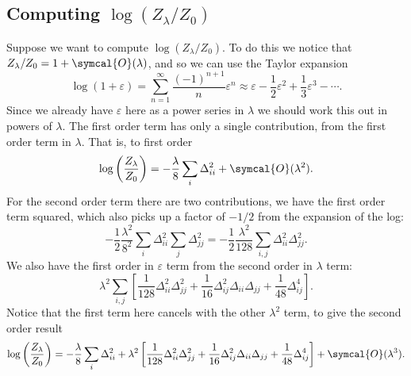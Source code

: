 \documentclass[fleqn]{NotesClass}
\newcommand{\order}{\symcal{O}}
\begin{document}
    \subsection{Computing \texorpdfstring{\(\log(Z_\lambda/Z_0)\)}{log(Zlambda/Z0)}}
    Suppose we want to compute \(\log(Z_\lambda/Z_0)\).
    To do this we notice that \(Z_\lambda/Z_0 = 1 + \order(\lambda)\), and so we can use the Taylor expansion
    \begin{equation}
        \log(1 + \varepsilon) = \sum_{n = 1}^{\infty} \frac{(-1)^{n + 1}}{n}\varepsilon^n \approx \varepsilon - \frac{1}{2}\varepsilon^2 + \frac{1}{3}\varepsilon^3 - \dotsb.
    \end{equation}
    Since we already have \(\varepsilon\) here as a power series in \(\lambda\) we should work this out in powers of \(\lambda\).
    The first order term has only a single contribution, from the first order term in \(\lambda\).
    That is, to first order
    \begin{equation}
        \log\left( \frac{Z_\lambda}{Z_0} \right) = -\frac{\lambda}{8}\sum_i \Delta_{ii}^2 + \order(\lambda^2).
    \end{equation}
    For the second order term there are two contributions, we have the first order term squared, which also picks up a factor of \(-1/2\) from the expansion of the log:
    \begin{equation}
        -\frac{1}{2} \frac{\lambda^2}{8^2} \sum_{i} \Delta_{ii}^2 \sum_j \Delta_{jj}^2 = -\frac{1}{2} \frac{\lambda^2}{128} \sum_{i, j} \Delta_{ii}^2\Delta_{jj}^2.
    \end{equation}
    We also have the first order in \(\varepsilon\) term from the second order in \(\lambda\) term:
    \begin{equation}
        \lambda^2 \sum_{i,j} \left[ \frac{1}{128}\Delta_{ii}^2\Delta_{jj}^2 + \frac{1}{16} \Delta_{ij}^2\Delta_{ii}\Delta_{jj} + \frac{1}{48}\Delta_{ij}^4 \right].
    \end{equation}
    Notice that the first term here cancels with the other \(\lambda^2\) term, to give the second order result
    \begin{equation}
        \log\left( \frac{Z_\lambda}{Z_0} \right) = -\frac{\lambda}{8} \sum_{i} \Delta_{ii}^2 + \lambda^2 \left[ \frac{1}{128}\Delta_{ii}^2\Delta_{jj}^2 + \frac{1}{16}\Delta_{ij}^2 \Delta_{ii} \Delta_{jj} + \frac{1}{48}\Delta_{ij}^4 \right] + \order(\lambda^3).
    \end{equation}
    
\end{document}
